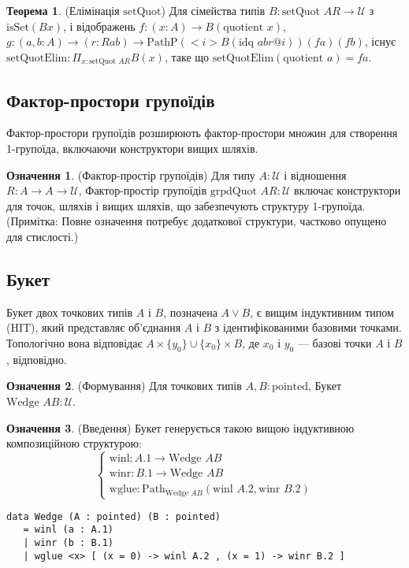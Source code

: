 \documentclass{article}
\theoremstyle{definition}
\newtheorem{theorem}{Теорема}
\newtheorem{definition}{Означення}
\begin{document}
\begin{theorem} (Елімінація \( \text{setQuot} \))
Для сімейства типів \( B : \text{setQuot } A R \to \mathcal{U} \) з \( \text{isSet}(B x) \),
і відображень \( f : (x : A) \to B(\text{quotient } x) \),
\( g : (a, b : A) \to (r : R a b) \to \text{PathP} (<i> B(\text{idq } a b r @ i)) (f a) (f b) \),
існує \( \text{setQuotElim} : \Pi_{x:\text{setQuot } A R} B(x) \), таке що \( \text{setQuotElim}(\text{quotient } a) = f a \).
\end{theorem}

\subsection{Фактор-простори групоїдів}
Фактор-простори групоїдів розширюють фактор-простори множин для створення 1-групоїда,
включаючи конструктори вищих шляхів.

\begin{definition} (Фактор-простір групоїдів)
Для типу \( A : \mathcal{U} \) і відношення \( R : A \to A \to \mathcal{U} \), Фактор-простір групоїдів \( \text{grpdQuot } A R : \mathcal{U} \) включає конструктори для точок, шляхів і вищих шляхів, що забезпечують структуру 1-групоїда. (Примітка: Повне означення потребує додаткової структури, частково опущено для стислості.)
\end{definition}

\newpage
\subsection{Букет}
Букет двох точкових типів \( A \) і \( B \), позначена \( A \vee B \),
є вищим індуктивним типом (HIT), який представляє об’єднання \( A \)
і \( B \) з ідентифікованими базовими точками. Топологічно
вона відповідає \( A \times \{ y_0 \} \cup \{ x_0 \} \times B \),
де \( x_0 \) і \( y_0 \) — базові точки \( A \) і \( B \), відповідно.

\begin{definition} (Формування)
Для точкових типів \( A, B : \text{pointed} \), Букет \( \text{Wedge } A B : \mathcal{U} \).
\end{definition}

\begin{definition} (Введення)
Букет генерується такою вищою індуктивною композиційною структурою:
\[
\begin{cases}
\text{winl} : A.1 \to \text{Wedge } A B \\
\text{winr} : B.1 \to \text{Wedge } A B \\
\text{wglue} : \text{Path}_{\text{Wedge } A B} (\text{winl } A.2, \text{winr } B.2)
\end{cases}
\]
\begin{lstlisting}
data Wedge (A : pointed) (B : pointed)
   = winl (a : A.1)
   | winr (b : B.1)
   | wglue <x> [ (x = 0) -> winl A.2 , (x = 1) -> winr B.2 ]
\end{lstlisting}
\end{definition}
\end{document}
